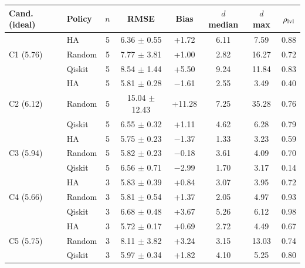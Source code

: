 \begin{tabular}{@{}llcccccc@{}}
\toprule
Cand. (ideal) & Policy & $n$ & RMSE & Bias & $d$ median & $d$ max & $\rho_{\rm lvl}$ \\
\midrule
\multirow{3}{*}{C1 (5.76)} & HA & 5 & 6.36 $\pm$ 0.55 & +1.72 & 6.11 & 7.59 & 0.88 \\
 & Random & 5 & 7.77 $\pm$ 3.81 & +1.00 & 2.82 & 16.27 & 0.72 \\
 & Qiskit & 5 & 8.54 $\pm$ 1.44 & +5.50 & 9.24 & 11.84 & 0.83 \\
\midrule
\multirow{3}{*}{C2 (6.12)} & HA & 5 & 5.81 $\pm$ 0.28 & $-$1.61 & 2.55 & 3.49 & 0.40 \\
 & Random & 5 & 15.04 $\pm$ 12.43 & +11.28 & 7.25 & 35.28 & 0.76 \\
 & Qiskit & 5 & 6.55 $\pm$ 0.32 & +1.11 & 4.62 & 6.28 & 0.79 \\
\midrule
\multirow{3}{*}{C3 (5.94)} & HA & 5 & 5.75 $\pm$ 0.23 & $-$1.37 & 1.33 & 3.23 & 0.59 \\
 & Random & 5 & 5.82 $\pm$ 0.23 & $-$0.18 & 3.61 & 4.09 & 0.70 \\
 & Qiskit & 5 & 6.56 $\pm$ 0.71 & $-$2.99 & 1.70 & 3.17 & 0.14 \\
\midrule
\multirow{3}{*}{C4 (5.66)} & HA & 3 & 5.83 $\pm$ 0.39 & +0.84 & 3.07 & 3.95 & 0.72 \\
 & Random & 3 & 5.81 $\pm$ 0.54 & +1.37 & 2.05 & 4.97 & 0.93 \\
 & Qiskit & 3 & 6.68 $\pm$ 0.48 & +3.67 & 5.26 & 6.12 & 0.98 \\
\midrule
\multirow{3}{*}{C5 (5.75)} & HA & 3 & 5.72 $\pm$ 0.17 & +0.69 & 2.72 & 4.49 & 0.67 \\
 & Random & 3 & 8.11 $\pm$ 3.82 & +3.24 & 3.15 & 13.03 & 0.74 \\
 & Qiskit & 3 & 5.97 $\pm$ 0.34 & +1.82 & 4.10 & 5.25 & 0.80 \\
\bottomrule
\end{tabular}
